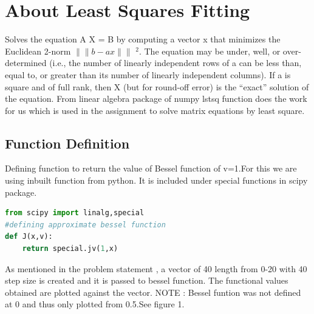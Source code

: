 \documentclass[a4paper]{article}
\begin{document}
\section{About Least Squares Fitting}

Solves the equation A X = B by computing a vector x that minimizes the Euclidean 2-norm $\parallel\parallel b - a x \parallel\parallel$ $^{2}$. The equation may be under\-, well\-, or over- determined (i.e., the number of linearly independent rows of a can be less than, equal to, or greater than its number of linearly independent columns). If a is square and of full rank, then X (but for round-off error) is the “exact” solution of the equation.
From linear algebra package of numpy lstsq function does the work for us which is used in the assignment to solve matrix equations by least square.

\subsection{Function Definition}

Defining function to return the value of Bessel function of v=1.For this we are using inbuilt function from python. It is included under special functions in scipy package.  

\begin{lstlisting}[language=Python ,caption=Defining Functions]
from scipy import linalg,special
#defining approximate bessel function
def J(x,v): 	
	return special.jv(1,x)

\end{lstlisting}

As mentioned in the problem statement , a vector of 40 length from 0-20 with 40 step size is created and it is passed to bessel function. The functional values obtained are plotted against the vector. NOTE : Bessel funtion was not defined at 0 and thus only plotted from 0.5.See figure 1.
\end{document}
